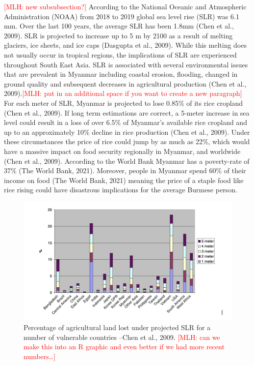 \documentclass{book}\usepackage{knitr}
\newcommand{\red}[1]{\textcolor{red}{[MLH: #1]}}
\begin{document}
\begin{knitrout}
\begin{kframe}
{\red{new subsubsection?}
According to the National Oceanic and Atmospheric Administration (NOAA) from 2018 to 2019 global sea level rise (SLR) was 6.1 mm. Over the last 100 years, the average SLR has been 1.8mm (Chen et al., 2009). SLR is projected to increase up to 5 m by 2100 as a result of melting glaciers, ice sheets, and ice caps (Dasgupta et al., 2009). While this melting does not usually occur in tropical regions, the implications of SLR are experienced throughout South East Asia. SLR is associated with several environmental issues that are prevalent in Myanmar including coastal erosion, flooding, changed in ground quality and subsequent decreases in agricultural production (Chen et al., 2009).\red{put in an additional space if you want to create a new paragraph}
	For each meter of SLR, Myanmar is projected to lose 0.85\% of its rice cropland (Chen et al., 2009). If long term estimations are correct, a 5-meter increase in sea level could result in a loss of over 6.5\% of Myanmar’s available rice cropland and up to an approximately 10\% decline in rice production (Chen et al., 2009). Under these circumstances the price of rice could jump by as much as 22\%, which would have a massive impact on food security regionally in Myanmar, and worldwide (Chen et al., 2009). According to the World Bank Myanmar has a poverty-rate of 37\% (The World Bank, 2021). Moreover, people in Myanmar spend 60\% of their income on food (The World Bank, 2021) meaning the price of a staple food like rice rising could have disastrous implications for the average Burmese person.

\begin{figure}
\includegraphics[width=\linewidth]{images/myanmar/Image6.jpg}
\caption{Percentage of agricultural land lost under projected SLR for a number of vulnerable countries --Chen et al., 2009. \red{can we make this into an R graphic and even better if we had more recent numbers\ldots}}
\end{figure}

}
\end{kframe}
\end{knitrout}
\end{document}
